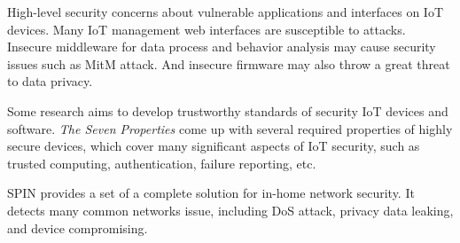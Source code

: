 High-level security concerns about vulnerable applications and interfaces on IoT devices. 
Many IoT management web interfaces are susceptible to attacks\cite{owasp2016url}. 
Insecure middleware for data process and behavior analysis may cause security issues such as MitM attack\cite{conzon2012virtus,levy2015ownership}. 
And insecure firmware may also throw a great threat to data privacy\cite{owasp2016url}.

Some research aims to develop trustworthy standards of security IoT devices and software. 
\textit{The Seven Properties}\cite{hunt2017the} come up with several required properties of highly secure devices, which cover many significant aspects of IoT security, such as trusted computing, authentication, failure reporting, etc.

SPIN\cite{hesselman2017spin} provides a set of a complete solution for in-home network security. 
It detects many common networks issue, including DoS attack, privacy data leaking, and device compromising.
